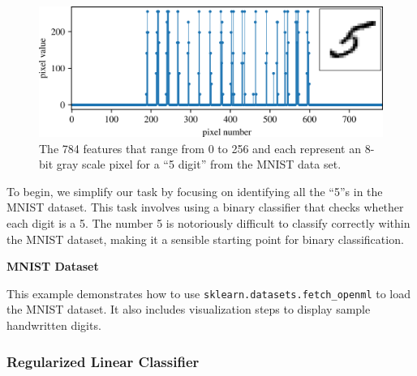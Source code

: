 \documentclass[12pt,letter]{article}
\begin{document}
\begin{data}
\begin{figure}[H]
	\centering
	\includegraphics[width=6.0in]{../figures/MNIST_digit_features}
	\caption{The 784 features that range from 0 to 256 and each represent an 8-bit gray scale pixel for a ``5 digit'' from the MNIST data set.}
	\label{fig:MNIST_digit_features}
\end{figure}


\end{data}


To begin, we simplify our task by focusing on identifying all the ``5''s in the MNIST dataset. This task involves using a binary classifier that checks whether each digit is a 5. The number 5 is notoriously difficult to classify correctly within the MNIST dataset, making it a sensible starting point for binary classification.


\begin{example}
\textbf{MNIST Dataset}

\noindent This example demonstrates how to use \texttt{sklearn.datasets.fetch\_openml} to load the MNIST dataset. It also includes  visualization steps to display sample handwritten digits.
\end{example}



\subsubsection{Regularized Linear Classifier}
\end{document}
